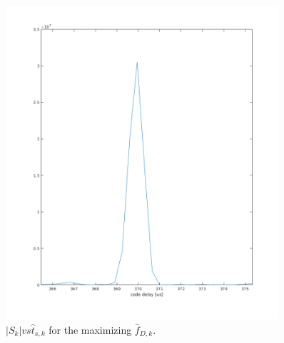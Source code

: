 \begin{figure}[H]
	\centering
	\includegraphics[width=0.9\textwidth]{figs/Sk_tau.png}
	\caption{$|S_k| vs \hat{t}_{s,k}$ for the maximizing $\hat{f}_{D,k}$.}
	\label{fig:sk_tau}
\end{figure}
